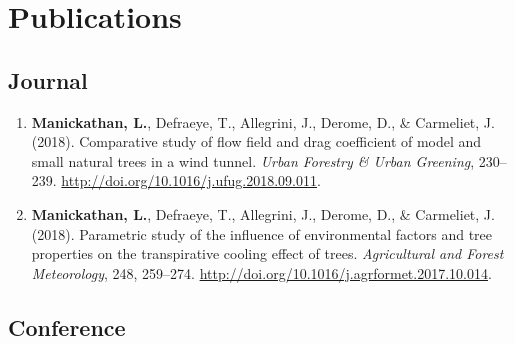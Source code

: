 \vfill

\section*{Publications}
 
\subsection*{Journal}

\begin{enumerate}	
	\item \textbf{Manickathan, L.}, Defraeye, T., Allegrini, J., Derome, D., \& Carmeliet, J. (2018). Comparative study of flow field and drag coefficient of model and small natural trees in a wind tunnel. \textit{Urban Forestry \& Urban Greening}, 230–239. \url{http://doi.org/10.1016/j.ufug.2018.09.011}.
	
	\item \textbf{Manickathan, L.}, Defraeye, T., Allegrini, J., Derome, D., \& Carmeliet, J. (2018). Parametric study of the influence of environmental factors and tree properties on the transpirative cooling effect of trees. \textit{Agricultural and Forest Meteorology}, 248, 259–274. \url{http://doi.org/10.1016/j.agrformet.2017.10.014}.
\end{enumerate}

\subsection*{Conference}

